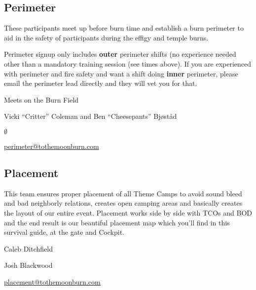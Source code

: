 
\subsection*{Perimeter}
These participants meet up before burn time and establish a burn perimeter to aid in the safety of participants during the \gls{effigy} and \gls{temple} burns.

Perimeter signup only includes \textbf{outer} perimeter shifts (no experience needed other than a mandatory training session (see times above). If you are experienced with perimeter and fire safety and want a shift doing \textbf{inner} perimeter, please email the perimeter lead directly and they will vet you for that.

Meets on the Burn Field

\begin{description}[leftmargin=6em,noitemsep,style=nextline]
   \item[Lead:] Vicki ``Critter'' Coleman and Ben ``Cheesepants'' Bj{\o}st{\aa}d
   \item[Co-leads:] $\emptyset$
   \item[Contact:] \url{perimeter@tothemoonburn.com}
\end{description}


\subsection*{Placement}
This team ensures proper placement of all Theme Camps to avoid sound bleed and bad neighborly relations, creates open camping areas and basically creates the layout of our entire event. Placement works side by side with TCOs and BOD and the end result is our beautiful placement map which you'll find in this survival guide, at the gate and Cockpit. 
\begin{description}[leftmargin=6em,noitemsep,style=nextline]
   \item[Lead:] Caleb Ditchfield
   \item[Co-leads:] Josh Blackwood
   \item[Contact:] \url{placement@tothemoonburn.com}
\end{description}


